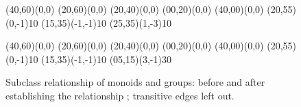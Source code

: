 \begin{isabellebody}
\begin{isamarkuptext}
  \begin{figure}[htbp]
   \begin{center}
     \small
     \unitlength 0.6mm
     \begin{picture}(40,60)(0,0)
       \put(20,60){\makebox(0,0){}}
       \put(20,40){\makebox(0,0){}}
       \put(00,20){\makebox(0,0){}}
       \put(40,00){\makebox(0,0){}}
       \put(20,55){\vector(0,-1){10}}
       \put(15,35){\vector(-1,-1){10}}
       \put(25,35){\vector(1,-3){10}}
     \end{picture}
     \hspace{8em}
     \begin{picture}(40,60)(0,0)
       \put(20,60){\makebox(0,0){}}
       \put(20,40){\makebox(0,0){}}
       \put(00,20){\makebox(0,0){}}
       \put(40,00){\makebox(0,0){}}
       \put(20,55){\vector(0,-1){10}}
       \put(15,35){\vector(-1,-1){10}}
       \put(05,15){\vector(3,-1){30}}
     \end{picture}
     \caption{Subclass relationship of monoids and groups:
        before and after establishing the relationship
        ;  transitive edges left out.}
     \label{fig:subclass}
   \end{center}
  \end{figure}


\end{isamarkuptext}
\end{isabellebody}
